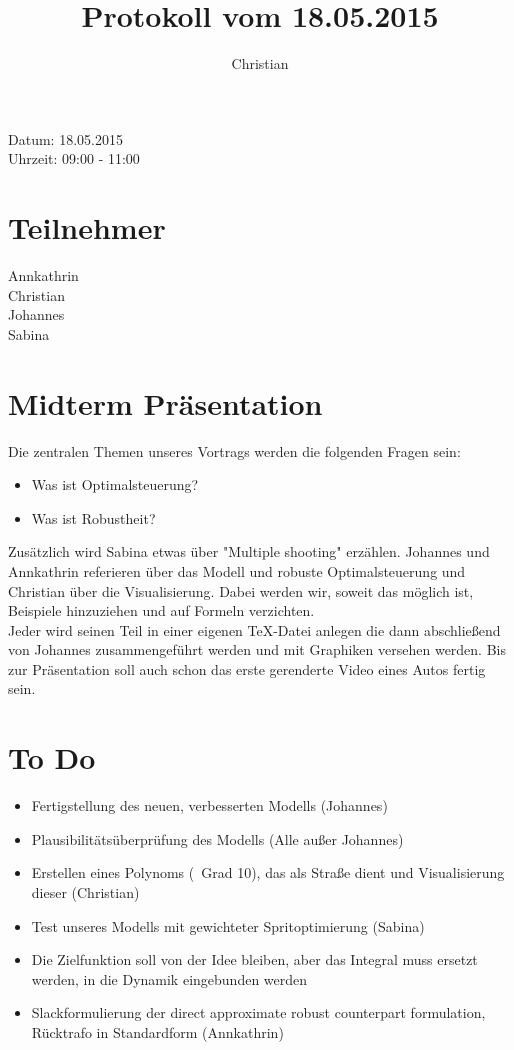 \documentclass[12pt,a4paper]{article}
\theoremstyle{definition}
\theoremstyle{plain}
\begin{document}
	
\title{Protokoll vom 18.05.2015}
\author{Christian}
\maketitle

Datum: 18.05.2015\\
Uhrzeit: 09:00 - 11:00

\tableofcontents

\section{Teilnehmer}
Annkathrin\\
Christian\\
Johannes\\
Sabina

\section{Midterm Präsentation}

Die zentralen Themen unseres Vortrags werden die folgenden Fragen sein:

\begin{itemize}
\item Was ist Optimalsteuerung?

\item Was ist Robustheit?
\end{itemize}
Zusätzlich wird Sabina etwas über "Multiple shooting" erzählen. Johannes und Annkathrin referieren über das Modell und robuste Optimalsteuerung und Christian über die Visualisierung.
Dabei werden wir, soweit das möglich ist, Beispiele hinzuziehen und auf Formeln verzichten. \\
Jeder wird seinen Teil in einer eigenen TeX-Datei anlegen die dann abschließend von Johannes zusammengeführt werden und mit Graphiken versehen werden.
Bis zur Präsentation soll auch schon das erste gerenderte Video eines Autos fertig sein.

\section{To Do}
\begin{itemize}
\item Fertigstellung des neuen, verbesserten Modells (Johannes)

\item Plausibilitätsüberprüfung des Modells (Alle außer Johannes)

\item Erstellen eines Polynoms (~Grad 10), das als Straße dient und Visualisierung dieser (Christian)

\item Test unseres Modells mit gewichteter Spritoptimierung (Sabina)

\item Die Zielfunktion soll von der Idee bleiben, aber das Integral muss ersetzt werden, in die Dynamik eingebunden werden

\item Slackformulierung der direct approximate robust counterpart formulation, Rücktrafo in Standardform (Annkathrin)
\end{itemize}
\end{document}
